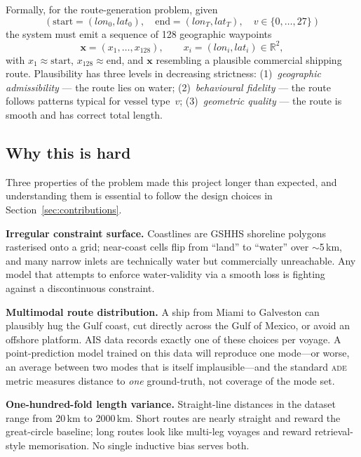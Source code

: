 \documentclass[11pt,a4paper]{article}
\newcommand{\ade}{\textsc{ade}}
\begin{document}
Formally, for the route-generation problem, given
\[
  (\text{start} = (lon_0, lat_0),\quad
   \text{end}   = (lon_T, lat_T),\quad
   v \in \{0,\ldots,27\})
\]
the system must emit a sequence of 128 geographic waypoints
\[
  \mathbf{x} = (x_1,\ldots,x_{128}),\qquad
  x_i = (lon_i, lat_i) \in \mathbb{R}^2,
\]
with $x_1 \approx \text{start}$, $x_{128} \approx \text{end}$,
and $\mathbf{x}$ resembling a plausible commercial shipping route.
Plausibility has three levels in decreasing strictness:
(1)~\emph{geographic admissibility} --- the route lies on water;
(2)~\emph{behavioural fidelity} --- the route follows patterns typical for vessel
type~$v$;
(3)~\emph{geometric quality} --- the route is smooth and has correct total length.

\subsection{Why this is hard}

Three properties of the problem made this project longer than expected,
and understanding them is essential to follow the design choices in
Section~\ref{sec:contributions}.

\textbf{Irregular constraint surface.}
Coastlines are GSHHS shoreline polygons~\cite{wessel1996gshhs} rasterised onto a
grid; near-coast cells flip from ``land'' to ``water'' over $\sim$5\,km, and
many narrow inlets are technically water but commercially unreachable.
Any model that attempts to enforce water-validity via a smooth loss is fighting
against a discontinuous constraint.

\textbf{Multimodal route distribution.}
A ship from Miami to Galveston can plausibly hug the Gulf coast, cut directly
across the Gulf of Mexico, or avoid an offshore platform.
AIS data records exactly one of these choices per voyage.
A point-prediction model trained on this data will reproduce one mode---or worse,
an average between two modes that is itself implausible---and the standard \ade{}
metric measures distance to \emph{one} ground-truth, not coverage of the mode set.

\textbf{One-hundred-fold length variance.}
Straight-line distances in the dataset range from 20\,km to 2000\,km.
Short routes are nearly straight and reward the great-circle baseline; long routes
look like multi-leg voyages and reward retrieval-style memorisation.
No single inductive bias serves both.
\end{document}

